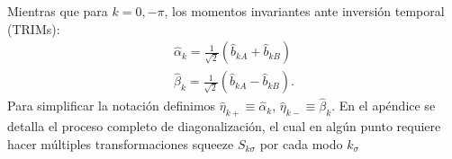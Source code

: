 Mientras que para $k = 0, -\pi$, los momentos invariantes ante inversión temporal (TRIMs):
\begin{subequations}
    \begin{align}
        \hat \alpha_{k} = \frac{1}{\sqrt{2}}\left(\hat b_{kA} + \hat b_{kB}\right)\\
        \hat \beta_{k} = \frac{1}{\sqrt{2}}\left(\hat b_{kA} - \hat b_{kB}\right).
    \end{align}
\end{subequations}
Para simplificar la notación definimos $\hat \eta_{k+} \equiv \hat \alpha_k$, $\hat \eta_{k-} \equiv \hat \beta_k$. En el apéndice se detalla el proceso completo de diagonalización, el cual en algún punto requiere hacer múltiples transformaciones squeeze $S_{k\sigma}$ por cada modo $k_\sigma$
 
